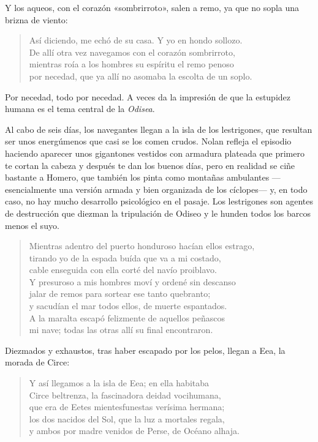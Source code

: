 Y los aqueos, con el corazón «sombrirroto», salen a remo, ya que no sopla una brizna de viento:

\begin{verse}
Así diciendo, me echó de su casa. Y yo en hondo sollozo.\\
De allí otra vez navegamos con el corazón sombrirroto,\\
mientras roía a los hombres su espíritu el remo penoso\\
por necedad, que ya allí no asomaba la escolta de un soplo.
\end{verse}

Por necedad, todo por necedad. A veces da la impresión de que la estupidez humana es el tema central de la \emph{Odisea}.

Al cabo de seis días, los navegantes llegan a la isla de los lestrigones, que resultan ser unos energúmenos que casi se los comen crudos. Nolan refleja el episodio haciendo aparecer unos gigantones vestidos con armadura plateada que primero te cortan la cabeza y después te dan los buenos días, pero en realidad se ciñe bastante a Homero, que también los pinta como montañas ambulantes ---esencialmente una versión armada y bien organizada de los cíclopes--- y, en todo caso, no hay mucho desarrollo psicológico en el pasaje. Los lestrigones son agentes de destrucción que diezman la tripulación de Odiseo y le hunden todos los barcos menos el suyo.

\begin{verse}
Mientras adentro del puerto honduroso hacían ellos estrago,\\
tirando yo de la espada buída que va a mi costado,\\
cable enseguida con ella corté del navío proiblavo.\\
Y presuroso a mis hombres moví y ordené sin descanso\\
jalar de remos para sortear ese tanto quebranto;\\
y sacudían el mar todos ellos, de muerte espantados.\\
A la maralta escapó felizmente de aquellos peñascos\\
mi nave; todas las otras allí su final encontraron.
\end{verse}

Diezmados y exhaustos, tras haber escapado por los pelos, llegan a Eea, la morada de Circe:

\begin{verse}
Y así llegamos a la isla de Eea; en ella habitaba\\
Circe beltrenza, la fascinadora deidad vocihumana,\\
que era de Eetes mientesfunestas verísima hermana;\\
los dos nacidos del Sol, que la luz a mortales regala,\\
y ambos por madre venidos de Perse, de Océano alhaja.
\end{verse}

